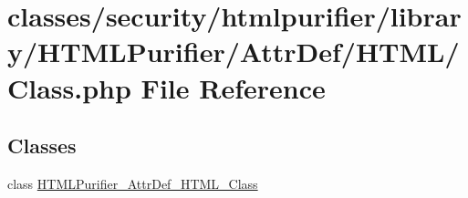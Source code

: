 \hypertarget{Class_8php}{\section{classes/security/htmlpurifier/library/\+H\+T\+M\+L\+Purifier/\+Attr\+Def/\+H\+T\+M\+L/\+Class.php File Reference}
\label{Class_8php}
}
\subsection*{Classes}
\begin{DoxyCompactItemize}
\item 
class \hyperlink{classHTMLPurifier__AttrDef__HTML__Class}{H\+T\+M\+L\+Purifier\+\_\+\+Attr\+Def\+\_\+\+H\+T\+M\+L\+\_\+\+Class}
\end{DoxyCompactItemize}
